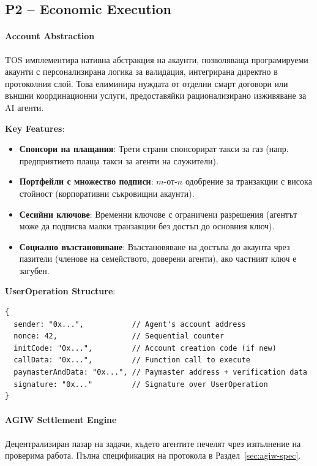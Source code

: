\documentclass[11pt]{article}
\begin{document}
\subsection{P2 -- Economic Execution}
\label{sec:pillar-economic}

\paragraph{Account Abstraction}
TOS имплементира нативна абстракция на акаунти, позволяваща програмируеми акаунти с персонализирана логика за валидация, интегрирана директно в протоколния слой. Това елиминира нуждата от отделни смарт договори или външни координационни услуги, предоставяйки рационализирано изживяване за AI агенти.

\textbf{Key Features}:
\begin{itemize}[noitemsep]
  \item \textbf{Спонсори на плащания}: Трети страни спонсорират такси за газ (напр. предприятието плаща такси за агенти на служители).
  \item \textbf{Портфейли с множество подписи}: $m$-от-$n$ одобрение за транзакции с висока стойност (корпоративни съкровищни акаунти).
  \item \textbf{Сесийни ключове}: Временни ключове с ограничени разрешения (агентът може да подписва малки транзакции без достъп до основния ключ).
  \item \textbf{Социално възстановяване}: Възстановяване на достъпа до акаунта чрез пазители (членове на семейството, доверени агенти), ако частният ключ е загубен.
\end{itemize}

\textbf{UserOperation Structure}:
\begin{verbatim}
{
  sender: "0x...",           // Agent's account address
  nonce: 42,                 // Sequential counter
  initCode: "0x...",         // Account creation code (if new)
  callData: "0x...",         // Function call to execute
  paymasterAndData: "0x...", // Paymaster address + verification data
  signature: "0x..."         // Signature over UserOperation
}
\end{verbatim}

\paragraph{AGIW Settlement Engine}
Децентрализиран пазар на задачи, където агентите печелят чрез изпълнение на проверима работа. Пълна спецификация на протокола в Раздел~\ref{sec:agiw-spec}.
\end{document}
